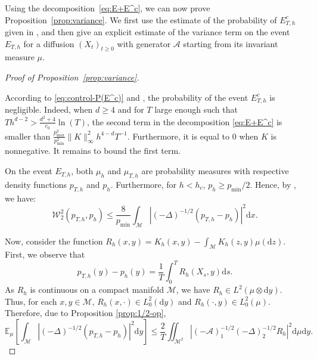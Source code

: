\documentclass[10pt,a4paper]{article}
\newcommand{\E}{{\mathbb E}}
\newcommand\cA{\mathcal{A}}
\newcommand\cM{\mathcal{M}}
\newcommand\W{\mathcal{W}}
\newcommand\dd{\mathrm{d}}
\newcommand{\ABS}[1]{{{\left| #1 \right|}}} %
\newcommand{\PAR}[1]{{{\left(#1\right)}}} %
\newcommand{\SBRA}[1]{{{\left[#1\right]}}} %
\begin{document}
Using the decomposition~\eqref{eq:E+E^c}, we can now prove Proposition~\ref{prop:variance}. We first use the estimate of the probability of $E_{T,h}^c$ given in , and then give an explicit estimate of the variance term  on the event $E_{T,h}$ for a diffusion $(X_t)_{t\ge 0}$ with generator $\cA$ starting from its invariant measure $\mu$.

\begin{proof}[Proof of Proposition~\ref{prop:variance}] \

According to \eqref{eq:control-P(E^c)} and , the probability of the event $E^c_{T,h}$ is negligible. Indeed, {when $d\ge 4$ and for $T$ large enough such that $Th^{d-2}> \frac{d^2+4}{c_0}\ln(T)$,} the second term in the decomposition \eqref{eq:E+E^c} is smaller than $\frac{p^2_{\max}}{p^2_{\min}}\|K\|_\infty^2 h^{4-d}T^{-1}$.
Furthermore, it is equal to $0$ when $K$ is nonnegative. It remains to bound the first term.





On the event $E_{T,h}$, both $\mu_h$ and $\mu_{T,h}$ are probability measures with respective density functions $p_{T,h}$ and $p_h$. Furthermore, for $h<h_c$, $p_h\ge p_{\min}/2$. Hence, by , we have: 
	\begin{equation}
		 \label{ineq:  variance inequality 1}
		\W_2^2(p_{T,h},p_h)\le \frac{8}{p_{\min}} \int_\cM\ABS{\PAR{-\Delta}^{-1/2}\PAR{p_{T,h}-p_h}}^2\dd x.
	\end{equation}

	Now, consider the function $R_h(x,y)= K_h(x,y) -\int_\cM K_h(z,y) \mu (\dd z)$. First, we observe  that $$p_{T,h}(y) -p_h(y)=  \frac{1}{T} \int_0^T  R_h(X_s,y) \dd s.$$
	As $R_h$ is continuous on a compact manifold $\cM$, we have $R_h \in L^2( \mu \otimes \dd y)$. 
	Thus, for each $x,y \in \cM$, $R_h(x, \cdot ) \in L_0^2(\dd y)$ and $R_h(\cdot, y) \in L_0^2(\mu)$.  Therefore, due to Proposition \ref{prop:1/2-op},
	\begin{equation} \label{ineq:  variance inequality 3}
		\E_\mu  \SBRA{\int_\cM \ABS{\PAR{-\Delta}^{-1/2}\PAR{p_{T,h}-p_h}}^2\dd y} \le  \frac{2}{T}\iint_{\cM^2}\ABS{\PAR{-\cA}_1^{-1/2}\PAR{-\Delta}_2^{-1/2} R_h }^2\dd \mu \dd y.
	\end{equation}


\end{proof}
\end{document}
